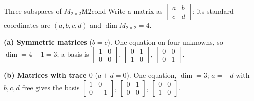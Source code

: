 \documentclass[11pt]{article}
\begin{document}
\begin{exmp}{Three subspaces of $M_{2\times2}$}{M2cond}
Write a matrix as $\begin{bmatrix}a&b\\c&d\end{bmatrix}$; its standard coordinates are $(a,b,c,d)$ and $\dim M_{2\times2}=4$.

\textbf{(a) Symmetric matrices} ($b=c$). One equation on four unknowns, so $\dim=4-1=3$; a basis is $\begin{bmatrix}1&0\\0&0\end{bmatrix}$, $\begin{bmatrix}0&1\\1&0\end{bmatrix}$, $\begin{bmatrix}0&0\\0&1\end{bmatrix}$.

\textbf{(b) Matrices with trace $0$} ($a+d=0$). One equation, $\dim=3$; $a=-d$ with $b,c,d$ free gives the basis $\begin{bmatrix}1&0\\0&-1\end{bmatrix}$, $\begin{bmatrix}0&1\\0&0\end{bmatrix}$, $\begin{bmatrix}0&0\\1&0\end{bmatrix}$.


\end{exmp}
\end{document}

